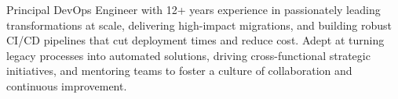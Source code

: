 \begin{cvparagraph}

Principal DevOps Engineer with 12+ years experience in passionately leading transformations at scale, delivering
high-impact migrations, and building robust CI/CD pipelines that cut deployment times and reduce cost. Adept at
turning legacy processes into automated solutions, driving cross-functional strategic initiatives, and mentoring
teams to foster a culture of collaboration and continuous improvement.

\end{cvparagraph}
